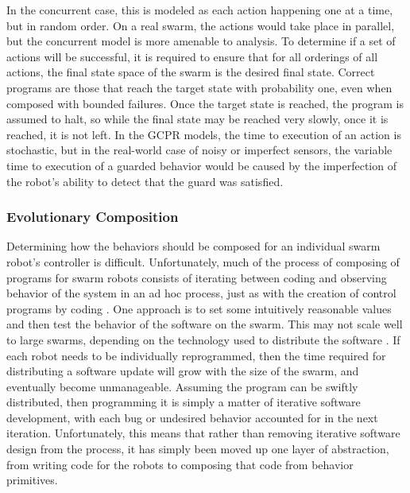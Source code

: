 \documentclass[]{article}
\begin{document}
In the concurrent case, this is modeled as each action happening one at a time, but in random order. 
On a real swarm, the actions would take place in parallel, but the concurrent model is more amenable to analysis. 
To determine if a set of actions will be successful, it is required to ensure that for all orderings of all actions, the final state space of the swarm is the desired final state. 
Correct programs are those that reach the target state with probability one, even when composed with bounded failures. 
Once the target state is reached, the program is assumed to halt, so while the final state may be reached very slowly, once it is reached, it is not left. 
In the GCPR models, the time to execution of an action is stochastic, but in the real-world case of noisy or imperfect sensors, the variable time to execution of a guarded behavior would be caused by the imperfection of the robot's ability to detect that the guard was satisfied. 


\subsubsection{Evolutionary Composition}

Determining how the behaviors should be composed for an individual swarm robot's controller is difficult. 
Unfortunately, much of the process of composing of programs for swarm robots consists of iterating between coding and observing behavior of the system in an ad hoc process, just as with the creation of control programs by coding \cite{palmer2005behavioral}. 
One approach is to set some intuitively reasonable values and then test the behavior of the software on the swarm. 
This may not scale well to large swarms, depending on the technology used to distribute the software \cite{rubenstein2014kilobot}.
If each robot needs to be individually reprogrammed, then the time required for distributing a software update will grow with the size of the swarm, and eventually become unmanageable. 
Assuming the program can be swiftly distributed, then programming it is simply a matter of iterative software development, with each bug or undesired behavior accounted for in the next iteration. 
Unfortunately, this means that rather than removing iterative software design from the process, it has simply been moved up one layer of abstraction, from writing code for the robots to composing that code from behavior primitives. 
\end{document}
